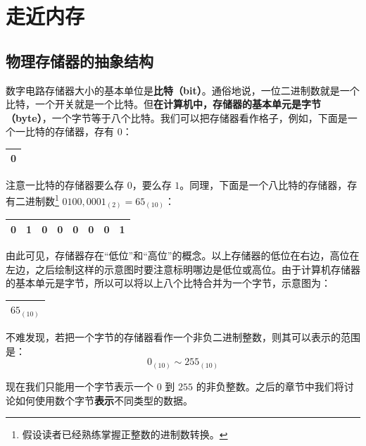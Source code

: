 
\section{走近内存}

\subsection{物理存储器的抽象结构}

数字电路存储器大小的基本单位是\textbf{比特（bit）}。通俗地说，一位二进制数就是一个比特，一个开关就是一个比特。但\textbf{在计算机中，存储器的基本单元是字节（byte）}，一个字节等于八个比特。我们可以把存储器看作格子，例如，下面是一个一比特的存储器，存有 $0$：
\begin{table}[H]
	\centering
	\begin{tabular}{|c|}
		\hline
		0
		\\\hline
	\end{tabular}
\end{table}

注意一比特的存储器要么存 $0$，要么存 $1$。同理，下面是一个八比特的存储器，存有二进制数\footnote{假设读者已经熟练掌握正整数的进制数转换。} $0100,0001_{(2)} = 65_{(10)}$：
\begin{table}[H]
	\centering
	\begin{tabular}{|c|c|c|c|c|c|c|c|}
		\hline
		0 & 1 & 0 & 0 & 0 & 0 & 0 & 1
		\\\hline
	\end{tabular}
\end{table}

由此可见，存储器存在“低位”和“高位”的概念。以上存储器的低位在右边，高位在左边，之后绘制这样的示意图时要注意标明哪边是低位或高位。由于计算机存储器的基本单元是字节，所以可以将以上八个比特合并为一个字节，示意图为：
\begin{table}[H]
	\centering
	\begin{tabular}{|c|}
		\hline
		$65_{(10)}$
		\\\hline
	\end{tabular}
\end{table}

不难发现，若把一个字节的存储器看作一个非负二进制整数，则其可以表示的范围是：
$$
0_{(10)} \sim 255_{(10)}
$$

现在我们只能用一个字节表示一个 $0$ 到 $255$ 的非负整数。之后的章节中我们将讨论如何使用数个字节\textbf{表示}不同类型的数据。

